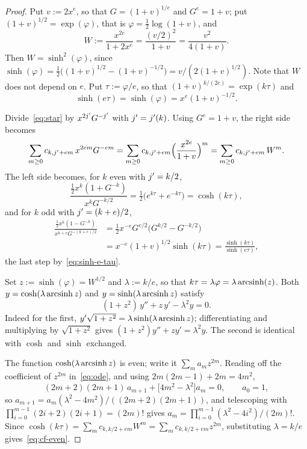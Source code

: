 \begin{proof}
Put $v := 2x^e$, so that $G = (1+v)^{1/e}$ and $G^e = 1+v$; put
$(1+v)^{1/2} = \exp(\varphi)$, that is $\varphi = \tfrac12 \log(1+v)$, and
\[
  W := \frac{x^{2e}}{1+2x^e} = \frac{(v/2)^2}{1+v} = \frac{v^2}{4(1+v)} .
\]
Then $W = \sinh^2(\varphi)$, since $\sinh(\varphi) = \tfrac12\bigl(
(1+v)^{1/2} - (1+v)^{-1/2}\bigr) = v/(2(1+v)^{1/2})$. Note that $W$ does not
depend on $e$. Put $\tau := \varphi/e$, so that $(1+v)^{k/(2e)} =
\exp(k\tau)$ and
\begin{equation}
\label{eq:sinh-e-tau}
  \sinh(e\tau) = \sinh(\varphi) = x^e (1+v)^{-1/2} .
\end{equation}

Divide~\eqref{eq:star} by $x^{2j'}G^{-j'}$ with $j' = j'(k)$. Using
$G^e = 1+v$, the right side becomes
\[
  \sum_{m \ge 0} c_{k,j'+em}\, x^{2em} G^{-em}
  = \sum_{m \ge 0} c_{k,j'+em} \Bigl( \frac{x^{2e}}{1+v} \Bigr)^{m}
  = \sum_{m \ge 0} c_{k,j'+em}\, W^m .
\]
The left side becomes, for $k$ even with $j' = k/2$,
\[
  \frac{\tfrac12 x^k (1 + G^{-k})}{x^k G^{-k/2}}
  = \tfrac12\bigl( e^{k\tau} + e^{-k\tau} \bigr) = \cosh(k\tau),
\]
and for $k$ odd with $j' = (k+e)/2$,
\begin{align*}
  \frac{\tfrac12 x^k (1 - G^{-k})}{x^{k+e} G^{-(k+e)/2}}
  &= \tfrac12 x^{-e} G^{e/2}\bigl( G^{k/2} - G^{-k/2} \bigr) \\
  &= x^{-e}(1+v)^{1/2}\sinh(k\tau)
   = \frac{\sinh(k\tau)}{\sinh(e\tau)},
\end{align*}
the last step by~\eqref{eq:sinh-e-tau}.

Set $z := \sinh(\varphi) = W^{1/2}$ and $\lambda := k/e$, so that $k\tau =
\lambda \varphi = \lambda \operatorname{arcsinh}(z)$. Both $y = \cosh(\lambda\operatorname{arcsinh} z)$
and $y = \sinh(\lambda \operatorname{arcsinh} z)$ satisfy
\begin{equation}
\label{eq:ode}
  (1+z^2)\,y'' + z\,y' - \lambda^2 y = 0 .
\end{equation}
Indeed for the first, $y'\sqrt{1+z^2} = \lambda \sinh(\lambda\operatorname{arcsinh} z)$;
differentiating and multiplying by $\sqrt{1+z^2}$ gives $(1+z^2)y'' + zy' =
\lambda^2 y$. The second is identical with $\cosh$ and $\sinh$ exchanged.

The function $\cosh(\lambda \operatorname{arcsinh} z)$ is even; write it $\sum_m a_m
z^{2m}$. Reading off the coefficient of $z^{2m}$ in~\eqref{eq:ode}, and
using $2m(2m-1) + 2m = 4m^2$,
\[
  (2m+2)(2m+1)\,a_{m+1} + \bigl[4m^2 - \lambda^2\bigr] a_m = 0,
  \qquad a_0 = 1,
\]
so $a_{m+1} = a_m(\lambda^2 - 4m^2)/((2m+2)(2m+1))$, and telescoping with
$\prod_{i=0}^{m-1}(2i+2)(2i+1) = (2m)!$ gives $a_m =
\prod_{i=0}^{m-1}(\lambda^2 - 4i^2)/(2m)!$. Since $\cosh(k\tau) = \sum_m
c_{k,k/2+em}W^m = \sum_m c_{k,k/2+em}z^{2m}$, substituting $\lambda = k/e$
gives~\eqref{eq:cf-even}.


\end{proof}
